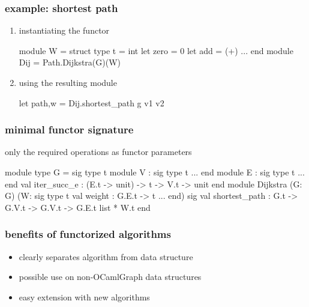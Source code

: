 \documentclass{beamer}
\newcommand{\ocamlgraph}{\textsf{OCamlGraph}}
\let\emph\alert
\begin{document}
\begin{frame}[fragile]
  \frametitle{example: shortest path}

  \begin{enumerate}
  \item \emph{instantiating} the functor
  \begin{ocaml}
    module W = struct
      type t = int
      let zero = 0
      let add = (+)
      ...
    end
    module Dij = Path.Dijkstra(G)(W)
  \end{ocaml}

  \item \emph{using} the resulting module
  \begin{ocaml}
    let path,w = Dij.shortest_path g v1 v2
  \end{ocaml}
  \end{enumerate}
\end{frame}

\begin{frame}[fragile]
  \frametitle{minimal functor signature}
only the \emph{required operations} as functor parameters
  \begin{ocaml}
module type G = sig
  type t
  module V : sig type t ... end
  module E : sig type t ... end
  val iter_succ_e : (E.t -> unit) -> t -> V.t -> unit
end
module Dijkstra
  (G: G)
  (W: sig type t val weight : G.E.t -> t ... end)
sig
  val shortest_path : G.t -> G.V.t -> G.V.t ->
                      G.E.t list * W.t
end
  \end{ocaml}
\end{frame}

\begin{frame}
  \frametitle{benefits of functorized algorithms}

  \begin{itemize}
  \item clearly \emph{separates} algorithm from data structure\vskip8pt
  \item possible use on \emph{non-\ocamlgraph} data structures\vskip8pt
  \item easy \emph{extension} with new algorithms\vskip8pt
  \end{itemize}

\end{frame}
\end{document}
